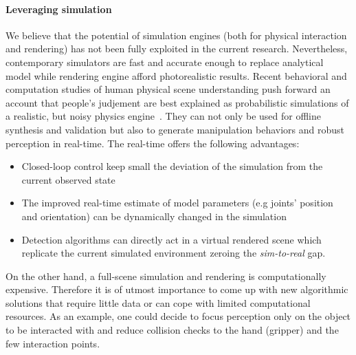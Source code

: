 \paragraph{Leveraging simulation} We believe that the potential of simulation engines (both for physical interaction and rendering) has not been fully exploited in the current research. Nevertheless, contemporary simulators are fast and accurate enough to replace analytical model while rendering engine afford photorealistic results. Recent behavioral and computation studies of human physical scene understanding push forward an account that people's judjement are best explained as probabilistic simulations of a realistic, but noisy physics engine~\cite{wu2015galileo}.
They can not only be used for offline synthesis and validation but also to generate manipulation behaviors and robust perception in real-time. The real-time offers the following advantages:
\begin{itemize}
\item Closed-loop control keep small the deviation of the simulation from the current observed state
\item The improved real-time estimate of model parameters (e.g joints' position and orientation) can be dynamically changed in the simulation
\item Detection algorithms can directly act in a virtual rendered scene which replicate the current simulated environment zeroing the \emph{sim-to-real} gap.
\end{itemize}
On the other hand, a full-scene simulation and rendering is computationally expensive. Therefore it is of utmost importance to come up with new algorithmic solutions that require little data or can cope with limited computational resources. As an example, one could decide to focus perception only on the object to be interacted with and reduce collision checks to the hand (gripper) and the few interaction points.  


